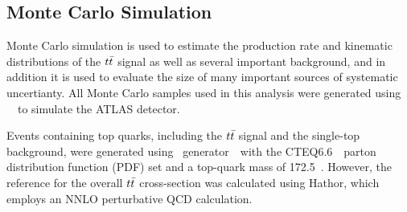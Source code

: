 

\subsection{Monte Carlo Simulation}
\label{s:mc}


Monte Carlo simulation is used to estimate the production rate and kinematic distributions of the $t\bar{t}$ signal as well as several important background, 
and in addition it is used to evaluate the size of many important sources of systematic uncertianty.
All Monte Carlo samples used in this analysis were generated using \GEANT~\cite{geant4}\
to simulate the ATLAS detector.



Events containing top quarks, including the $t\bar{t}$ signal and the single-top background,
were generated using \MCatNLO\ generator~\cite{mcatnlo1,Frixione:2003ei,Frixione:2005vw}\
with the CTEQ6.6~\cite{cteq66}\ parton distribution function (PDF)
set and a top-quark mass of 172.5~\GeV.
However, the reference for the overall $t\bar{t}$ cross-section was calculated using
{\sc Hathor}\cite{Aliev:2010}, which employs an NNLO perturbative QCD calculation.



